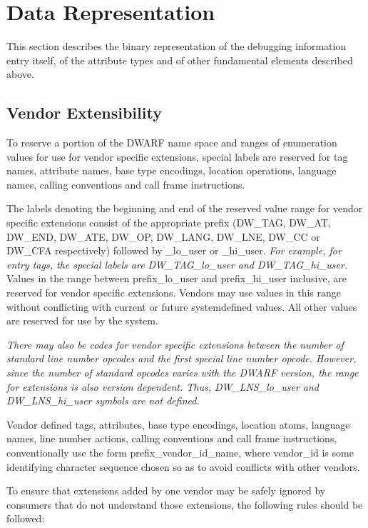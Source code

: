 \chapter{Data Representation}
\label{datarep:datarepresentation}

This section describes the binary representation of the
debugging information entry itself, of the attribute types
and of other fundamental elements described above.


\section{Vendor Extensibility}
\label{datarep:vendorextensibility}

To reserve a portion of the DWARF name space and ranges of
enumeration values for use for vendor specific extensions,
special labels are reserved for tag names, attribute names,
base type encodings, location operations, language names,
calling conventions and call frame instructions.

The labels denoting the beginning and end of the reserved
value range for vendor specific extensions consist of the
appropriate prefix (DW\_TAG, DW\_AT, DW\_END, DW\_ATE, DW\_OP,
DW\_LANG, DW\_LNE, DW\_CC or DW\_CFA respectively) followed by
\_lo\_user or \_hi\_user. 
\textit{For example, for entry tags, the special
labels are DW\_TAG\_lo\_user and DW\_TAG\_hi\_user.}
Values in the
range between prefix\_lo\_user and prefix\_hi\_user inclusive,
are reserved for vendor specific extensions. Vendors may
use values in this range without conflicting with current or
future system\dash defined values. All other values are reserved
for use by the system.

\textit{There may also be codes for vendor specific extensions
between the number of standard line number opcodes and
the first special line number opcode. However, since the
number of standard opcodes varies with the DWARF version,
the range for extensions is also version dependent. Thus,
DW\_LNS\_lo\_user and DW\_LNS\_hi\_user symbols are not defined.}

Vendor defined tags, attributes, base type encodings, location
atoms, language names, line number actions, calling conventions
and call frame instructions, conventionally use the form
prefix\_vendor\_id\_name, where vendor\_id is some identifying
character sequence chosen so as to avoid conflicts with
other vendors.

To ensure that extensions added by one vendor may be safely
ignored by consumers that do not understand those extensions,
the following rules should be followed:

